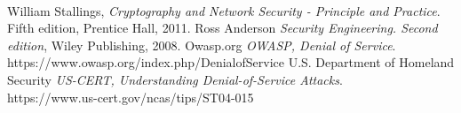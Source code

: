 \documentclass[a4paper,11pt]{article}
\begin{document}
\paragraph{}
\begin{thebibliography}{9}
William Stallings, \emph{Cryptography and Network Security - Principle and Practice}. Fifth edition, Prentice Hall, 2011.
Ross Anderson \emph{Security Engineering. Second edition}, Wiley Publishing, 2008.
Owasp.org \emph{OWASP, Denial of Service}.\\ https://www.owasp.org/index.php/Denial\textunderscore of\textunderscore Service
U.S. Department of Homeland Security \emph{US-CERT, Understanding Denial-of-Service Attacks}.\\ https://www.us-cert.gov/ncas/tips/ST04-015
\end{thebibliography}
\end{document}
